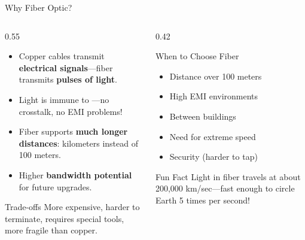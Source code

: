 \documentclass[aspectratio=169]{beamer}  %
\begin{document}
\begin{frame}{Why Fiber Optic?}
    \begin{columns}[T]
        \begin{column}{0.55\textwidth}
            \begin{itemize}
                \item Copper cables transmit \textbf{electrical signals}---fiber transmits \textbf{pulses of light}.
                \item Light is immune to ---no crosstalk, no EMI problems!
                \item Fiber supports \textbf{much longer distances}: kilometers instead of 100 meters.
                \item Higher \textbf{bandwidth potential} for future upgrades.
            \end{itemize}
            
            \vspace{0.3em}
            \begin{alertblock}{Trade-offs}
                More expensive, harder to terminate, requires special tools, more fragile than copper.
            \end{alertblock}
        \end{column}
        \begin{column}{0.42\textwidth}
            \begin{block}{When to Choose Fiber}
                \begin{itemize}
                    \item Distance over 100 meters
                    \item High EMI environments
                    \item Between buildings
                    \item Need for extreme speed
                    \item Security (harder to tap)
                \end{itemize}
            \end{block}
            
            \vspace{0.3em}
            \begin{exampleblock}{Fun Fact}
                Light in fiber travels at about 200,000 km/sec---fast enough to circle Earth 5 times per second!
            \end{exampleblock}
        \end{column}
    \end{columns}
\end{frame}
\end{document}
